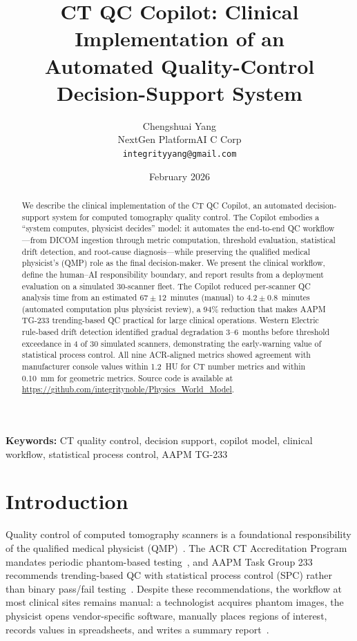 \documentclass[11pt]{article}
\title{%
  CT QC Copilot: Clinical Implementation of an\\
  Automated Quality-Control Decision-Support System}
\author{Chengshuai Yang\\
NextGen PlatformAI C Corp\\
\texttt{integrityyang@gmail.com}}
\date{February 2026}
\begin{document}
\maketitle
\linenumbers

\begin{abstract}
We describe the clinical implementation of the CT QC Copilot, an
automated decision-support system for computed tomography quality
control.
The Copilot embodies a ``system computes, physicist decides'' model:
it automates the end-to-end QC workflow---from DICOM ingestion
through metric computation, threshold evaluation, statistical drift
detection, and root-cause diagnosis---while preserving the qualified
medical physicist's (QMP) role as the final decision-maker.
We present the clinical workflow, define the human--AI responsibility
boundary, and report results from a deployment evaluation on a
simulated 30-scanner fleet.
The Copilot reduced per-scanner QC analysis time from an estimated
$67 \pm 12$~minutes (manual) to $4.2 \pm 0.8$~minutes (automated
computation plus physicist review), a 94\% reduction that makes
AAPM TG-233 trending-based QC practical for large clinical
operations.
Western Electric rule-based drift detection identified gradual
degradation 3--6~months before threshold exceedance in 4 of 30
simulated scanners, demonstrating the early-warning value of
statistical process control.
All nine ACR-aligned metrics showed agreement with manufacturer
console values within 1.2~HU for CT number metrics and within
0.10~mm for geometric metrics.
Source code is available at
\url{https://github.com/integritynoble/Physics_World_Model}.
\end{abstract}

\noindent\textbf{Keywords:}
CT quality control, decision support, copilot model, clinical
workflow, statistical process control, AAPM TG-233

\section{Introduction}
\label{sec:intro}

Quality control of computed tomography scanners is a foundational
responsibility of the qualified medical physicist
(QMP)~\cite{acr_ct_accreditation}.
The ACR CT Accreditation Program mandates periodic phantom-based
testing~\cite{acr_ct464}, and AAPM Task Group 233 recommends
trending-based QC with statistical process control (SPC) rather
than binary pass/fail testing~\cite{aapm_tg233}.
Despite these recommendations, the workflow at most clinical sites
remains manual: a technologist acquires phantom images, the physicist
opens vendor-specific software, manually places regions of interest,
records values in spreadsheets, and writes a summary
report~\cite{nowik2015ct_qa_automation}.
\end{document}
